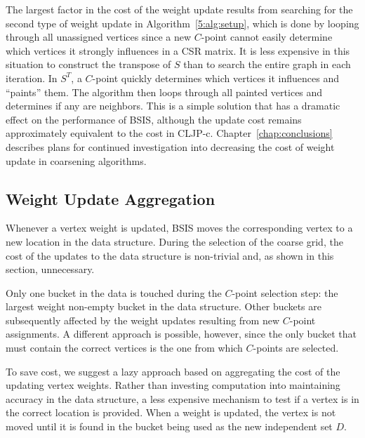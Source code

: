 \documentclass{elsart}
\begin{document}
The largest factor in the cost of the weight update results from
searching for the second type of weight update in
Algorithm~\ref{5:alg:setup}, which is done by looping through all
unassigned vertices since a new $C$-point cannot easily determine
which vertices it strongly influences in a CSR matrix. It is less
expensive in this situation to construct the transpose of $S$ than to
search the entire graph in each iteration. In $S^T$, a $C$-point
quickly determines which vertices it influences and ``paints''
them. The algorithm then loops through all painted vertices and
determines if any are neighbors. This is a simple solution that has a
dramatic effect on the performance of BSIS, although the update cost
remains approximately equivalent to the cost in
CLJP-c. Chapter~\ref{chap:conclusions} describes plans for continued
investigation into decreasing the cost of weight update in coarsening
algorithms.

\subsection{Weight Update Aggregation}
\label{5:sec:agg}
Whenever a vertex weight is updated, BSIS moves the corresponding
vertex to a new location in the data structure. During the selection
of the coarse grid, the cost of the updates to the data structure is
non-trivial and, as shown in this section, unnecessary.

Only one bucket in the data is touched during the $C$-point selection
step: the largest weight non-empty bucket in the data structure. Other
buckets are subsequently affected by the weight updates resulting from
new $C$-point assignments. A different approach is possible, however,
since the only bucket that must contain the correct vertices is the
one from which $C$-points are selected.

To save cost, we suggest a lazy approach based on aggregating the cost
of the updating vertex weights. Rather than investing computation into
maintaining accuracy in the data structure, a less expensive mechanism
to test if a vertex is in the correct location is provided. When a
weight is updated, the vertex is not moved until it is found in the
bucket being used as the new independent set $D$.
\end{document}
